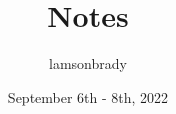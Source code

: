 \usepackage[utf8]{inputenc}

\title{Notes}
\author{lamsonbrady }
\date{September 6th - 8th, 2022}

\usepackage{parskip}

\usepackage{fancyhdr}
\pagestyle{fancy}

\usepackage{amsmath}
\usepackage{amssymb}

\newcommand{\psmall}[1]{
\left(\begin{smallmatrix}
#1
\end{smallmatrix} \right)
}

\newcommand{\bb}{\mathbb}
\newcommand{\R}{\mathbb{R}}
\renewcommand{\P}{\mathbb{P}}
\newcommand{\Z}{\mathbb{Z}}

\newcommand{\genericvec}[1]{
	\ensuremath{
		\left\{\vec{#1_1}, \vec{#1_2}, \dots, \vec{#1_n} \right\}
	}
}
